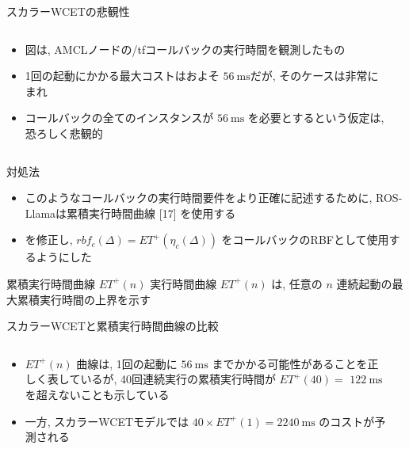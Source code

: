 \begin{frame}{スカラーWCETの悲観性}
    \begin{columns}
        \begin{column}{0.5\textwidth}
            \begin{itemize}
                \item 図は, AMCLノードの/tfコールバックの実行時間を観測したもの
                \item 1回の起動にかかる最大コストはおよそ $56 \mathrm{~ms}$だが, そのケースは非常にまれ
                \item コールバックの全てのインスタンスが $56 \mathrm{~ms}$ を必要とするという仮定は, 恐ろしく悲観的
            \end{itemize}
        \end{column}
        \begin{column}{0.5\textwidth}
        \end{column}
    \end{columns}
\end{frame}

\begin{frame}{対処法}
    \begin{itemize}
        \item このようなコールバックの実行時間要件をより正確に記述するために, ROS-Llamaは累積実行時間曲線 [17] を使用する
        \item {}を修正し, $r b f_{c}(\Delta)=E T^{+}\left(\eta_{c}(\Delta)\right)$ をコールバックのRBFとして使用するようにした
    \end{itemize}
    \begin{block}{累積実行時間曲線 $E T^{+}(n)$}
        実行時間曲線 $E T^{+}(n)$ は, 任意の $n$ 連続起動の最大累積実行時間の上界を示す
    \end{block}
\end{frame}

\begin{frame}{スカラーWCETと累積実行時間曲線の比較}
    \begin{columns}
        \begin{column}{0.5\textwidth}
            \begin{itemize}
                \item $E T^{+}(n)$ 曲線は, 1回の起動に $56 \mathrm{~ms}$ までかかる可能性があることを正しく表しているが, 40回連続実行の累積実行時間が $E T^{+}(40)=$  $122 \mathrm{~ms}$ を超えないことも示している
                \item 一方, スカラーWCETモデルでは $40 \times E T^{+}(1)=2240 \mathrm{~ms}$ のコストが予測される
            \end{itemize}
        \end{column}
        \begin{column}{0.5\textwidth}
        \end{column}
    \end{columns}
\end{frame}


